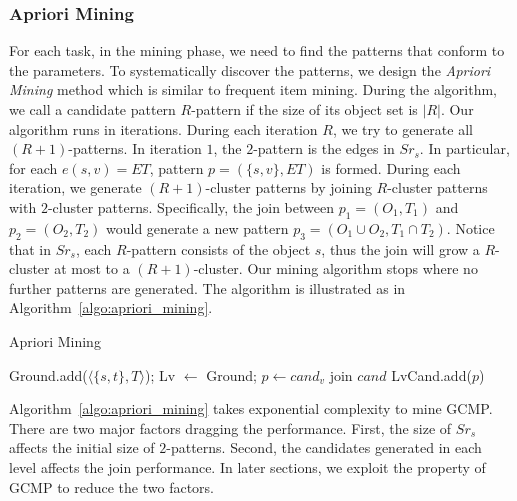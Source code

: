 \subsubsection{Apriori Mining}
For each task, in the mining phase, we need to find the patterns that conform to the parameters. To systematically discover the patterns, we design the \emph{Apriori Mining} method which
is similar to frequent item mining. During the algorithm, we call a candidate pattern $R$-pattern if the size of its object set is $|R|$. 
Our algorithm runs in iterations. During each iteration $R$, we try to generate all $(R+1)$-patterns. In iteration $1$, the $2$-pattern is the edges in $Sr_s$. In particular,
for each $e(s,v)=ET$, pattern $p=(\{s,v\}, ET)$ is formed. During each iteration, 
we generate $(R+1)$-cluster patterns by joining $R$-cluster patterns with $2$-cluster patterns. Specifically,
the join between $p_1=(O_1, T_1)$ and $p_2=(O_2, T_2)$ would generate a new pattern $p_3=(O_1 \cup O_2, T_1 \cap T_2)$. Notice that in $Sr_s$, each $R$-pattern consists of the object $s$, thus the join will grow a $R$-cluster at most to a $(R+1)$-cluster.
Our mining algorithm stops where no further patterns are generated. The algorithm is illustrated as in Algorithm~\ref{algo:apriori_mining}.

\begin{algorithm}
\caption{Apriori Mining}
\label{algo:apriori_mining}
\begin{algorithmic}
\State Ground.add($\langle \{s,t\}, T \rangle$);
\State Lv $\gets$ Ground;
\EndFor
{}
				\State $p \gets cand_v$ join $cand$
					\State LvCand.add($p$)
				\EndIf
			\EndFor
		\EndFor
	\Else
	\EndIf
\EndWhile
\end{algorithmic}
\end{algorithm}

Algorithm~\ref{algo:apriori_mining} takes exponential complexity to mine GCMP. There
are two major factors dragging the performance. First, the size of $Sr_s$ affects
the initial size of $2$-patterns. Second, the candidates generated in each level affects the join performance. In later
sections, we exploit the property of GCMP to reduce the two factors.